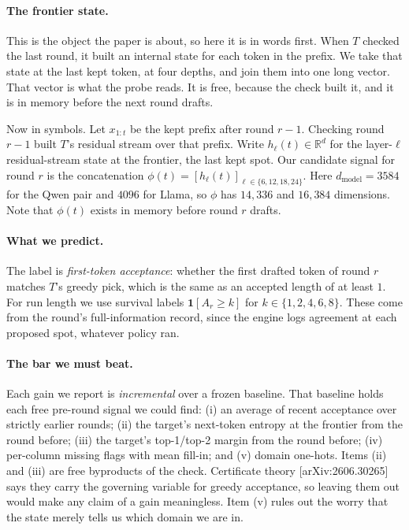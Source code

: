 \documentclass[11pt]{article}
\begin{document}
\paragraph{The frontier state.} This is the object the paper is about, so here
it is in words first. When $T$ checked the last round, it built an internal
state for each token in the prefix. We take that state at the last kept
token, at four depths, and join them into one long vector. That vector is what
the probe reads. It is free, because the check built it, and it is
in memory before the next round drafts.

Now in symbols. Let $x_{1:t}$ be the kept prefix after round $r{-}1$.
Checking round $r{-}1$ built $T$'s residual stream over that prefix.
Write $h_\ell(t)\in\mathbb{R}^{d}$ for the layer-$\ell$ residual-stream state at
the frontier, the last kept spot. Our candidate signal for round $r$
is the concatenation $\phi(t)=[h_{\ell}(t)]_{\ell\in\{6,12,18,24\}}$. Here
$d_{\mathrm{model}}=3584$ for the Qwen pair and $4096$ for Llama, so $\phi$ has
$14{,}336$ and $16{,}384$ dimensions. Note that $\phi(t)$ exists in memory
before round $r$ drafts.

\paragraph{What we predict.} The label is \emph{first-token acceptance}:
whether the first drafted token of round $r$ matches $T$'s greedy pick, which
is the same as an accepted length of at least $1$. For run length we use
survival labels $\mathbf{1}[A_r\ge k]$ for $k\in\{1,2,4,6,8\}$. These come from
the round's full-information record, since the engine logs agreement at each
proposed spot, whatever policy ran.

\paragraph{The bar we must beat.} Each gain we report is \emph{incremental}
over a frozen baseline. That baseline holds each free pre-round signal we
could find: (i) an average of recent acceptance over strictly earlier rounds;
(ii) the target's next-token entropy at the frontier from the round before;
(iii) the target's top-1/top-2 margin from the round before; (iv) per-column
missing flags with mean fill-in; and (v) domain one-hots. Items (ii) and (iii)
are free byproducts of the check. Certificate theory [arXiv:2606.30265] says
they carry the governing variable for greedy acceptance, so leaving them out
would make any claim of a gain meaningless. Item (v) rules out the worry that
the state merely tells us which domain we are in.
\end{document}
